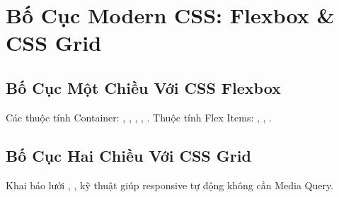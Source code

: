 \chapter{Bố Cục Modern CSS: Flexbox \& CSS Grid}
\label{chap:flexbox_grid}

\section{Bố Cục Một Chiều Với CSS Flexbox}
Các thuộc tính Container: , , , , .
Thuộc tính Flex Items: , , .

\section{Bố Cục Hai Chiều Với CSS Grid}
Khai báo lưới , , kỹ thuật  giúp responsive tự động không cần Media Query.
